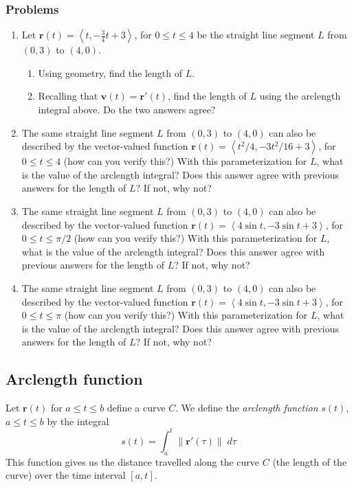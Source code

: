 \documentclass[12pt,letterpaper,fleqn]{article}
\newcommand{\lv}[1]{\ensuremath{\left\langle #1 \right\rangle}}
\renewcommand{\vec}[1]{\ensuremath{\pmb{#1}}}
\begin{document}
\subsubsection*{Problems}
  \begin{enumerate}
    \item Let $\vec{r}(t) = \lv{t, -\frac{3}{4} t + 3}$, for $0\leq t\leq 4$ be the straight line segment $L$ from $(0,3)$ to $(4,0)$.
    \begin{enumerate}
      \item Using geometry, find the length of $L$.
      \item Recalling that $\vec{v}(t) = \vec{r}'(t)$, find the length of $L$ using the arclength integral above. Do the two answers agree?
    \end{enumerate}
    \item The same straight line segment $L$ from $(0,3)$ to $(4,0)$ can also be described by the vector-valued function $\vec{r}(t) = \lv{t^2/4, -3t^2/16 + 3}$, for $0\leq t\leq 4$ (how can you verify this?) With this parameterization for $L$, what is the value of the arclength integral? Does this answer agree with previous answers for the length of $L$? If not, why not?
    \item The same straight line segment $L$ from $(0,3)$ to $(4,0)$ can also be described by the vector-valued function $\vec{r}(t) = \lv{4\sin t, -3\sin t + 3}$, for $0\leq t\leq \pi/2$ (how can you verify this?) With this parameterization for $L$, what is the value of the arclength integral? Does this answer agree with previous answers for the length of $L$? If not, why not?
    \item The same straight line segment $L$ from $(0,3)$ to $(4,0)$ can also be described by the vector-valued function $\vec{r}(t) = \lv{4\sin t, -3\sin t + 3}$, for $0\leq t\leq \pi$ (how can you verify this?) With this parameterization for $L$, what is the value of the arclength integral? Does this answer agree with previous answers for the length of $L$? If not, why not?
  \end{enumerate}
  \newpage
  \subsection*{Arclength function}
  Let $\vec{r}(t)$ for $a\leq t\leq b$ define a curve $C$. We define the \emph{arclength function} $s(t)$, $a\leq t\leq b$ by the integral
  \begin{equation*}
    s(t) = \int_a^t \|\vec{r}'(\tau)\|\;d\tau
  \end{equation*}
  This function gives us the distance travelled along the curve $C$ (the length of the curve) over the time interval $[a, t]$.
\end{document}
